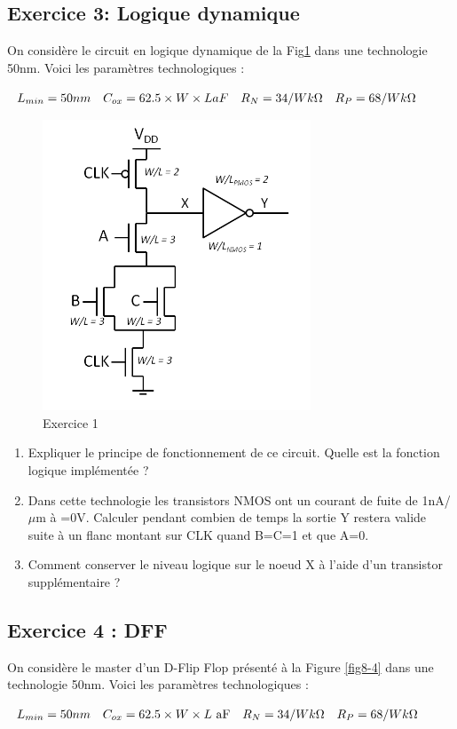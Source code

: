 \documentclass[paper=a4, fontsize=11pt]{article} %
\numberwithin{equation}{section} %
\numberwithin{figure}{section} %
\numberwithin{table}{section} %
\begin{document}
\subsection*{Exercice 3: Logique dynamique}
On considère le circuit en logique dynamique de la Fig\ref{fig8-3} dans une technologie 50nm. Voici les paramètres technologiques :
\begin{center} $ \begin{array}{l l l l} L_{min} = 50nm & C_{ox} = 62.5\times W \times L aF & R_N=34/W k \Omega & R_P=68/W k\Omega\\ \end{array}$\end{center}

\begin{figure}[!htbp]
   \centering
   \includegraphics[width=8cm]{figure/fig8-3.png}
   \caption{Exercice 1}
   \label{fig8-3}
\end{figure}

\begin{enumerate}
\item Expliquer le principe de fonctionnement de ce circuit. Quelle est la fonction logique implémentée ?
\item Dans cette technologie les transistors NMOS ont un courant de fuite de 1nA/$\mu$m à \vgs=0V. Calculer pendant combien de temps la sortie Y restera valide suite à un flanc montant sur CLK quand B=C=1 et que A=0.
\item Comment conserver le niveau logique sur le noeud X à l'aide d'un transistor supplémentaire ?
\end{enumerate}

\newpage
\subsection*{Exercice 4 : DFF}
On considère le master d'un D-Flip Flop présenté à la Figure \ref{fig8-4} dans une technologie 50nm. Voici les paramètres technologiques :
\begin{center} $ \begin{array}{l l l l} L_{min} = 50nm & C_{ox} = 62.5\times W \times L\text{ aF} & R_N=34/W k \Omega& R_P=68/W k\Omega\\ \end{array}$\end{center}
\end{document}
